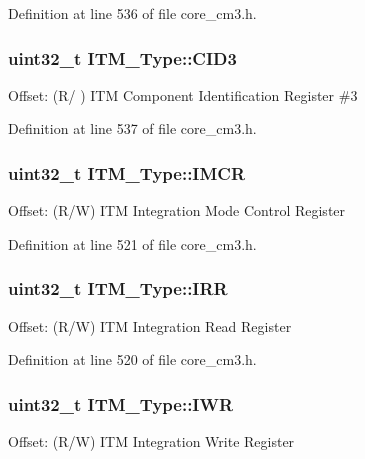 \-Definition at line 536 of file core\-\_\-cm3.\-h.

\hypertarget{struct_i_t_m___type_a0e7aa199619cc7ac6baddff9600aa52e}{
\subsubsection[{\-C\-I\-D3}]{ uint32\-\_\-t {\bf \-I\-T\-M\-\_\-\-Type\-::\-C\-I\-D3}}}\label{struct_i_t_m___type_a0e7aa199619cc7ac6baddff9600aa52e}
\-Offset\-: (\-R/ ) \-I\-T\-M \-Component \-Identification \-Register \#3 

\-Definition at line 537 of file core\-\_\-cm3.\-h.

\hypertarget{struct_i_t_m___type_ab2e87d8bb0e3ce9b8e0e4a6a6695228a}{
\subsubsection[{\-I\-M\-C\-R}]{ uint32\-\_\-t {\bf \-I\-T\-M\-\_\-\-Type\-::\-I\-M\-C\-R}}}\label{struct_i_t_m___type_ab2e87d8bb0e3ce9b8e0e4a6a6695228a}
\-Offset\-: (\-R/\-W) \-I\-T\-M \-Integration \-Mode \-Control \-Register 

\-Definition at line 521 of file core\-\_\-cm3.\-h.

\hypertarget{struct_i_t_m___type_ae43a66174b8ab182ff595e5f5da9f235}{
\subsubsection[{\-I\-R\-R}]{ uint32\-\_\-t {\bf \-I\-T\-M\-\_\-\-Type\-::\-I\-R\-R}}}\label{struct_i_t_m___type_ae43a66174b8ab182ff595e5f5da9f235}
\-Offset\-: (\-R/\-W) \-I\-T\-M \-Integration \-Read \-Register 

\-Definition at line 520 of file core\-\_\-cm3.\-h.

\hypertarget{struct_i_t_m___type_af53499fc94cda629afb2fec858d2ad1c}{
\subsubsection[{\-I\-W\-R}]{ uint32\-\_\-t {\bf \-I\-T\-M\-\_\-\-Type\-::\-I\-W\-R}}}\label{struct_i_t_m___type_af53499fc94cda629afb2fec858d2ad1c}
\-Offset\-: (\-R/\-W) \-I\-T\-M \-Integration \-Write \-Register 

